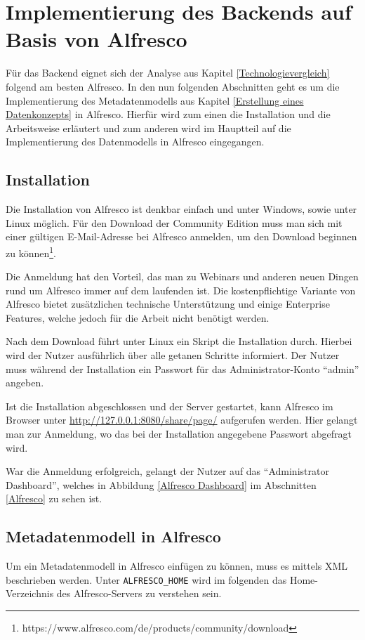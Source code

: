 \section{Implementierung des Backends auf Basis von Alfresco} \label{Implementierung Backend}
F\"ur das Backend eignet sich der Analyse aus Kapitel \ref{Technologievergleich} folgend am besten Alfresco. In den nun folgenden Abschnitten geht es um die Implementierung des Metadatenmodells aus Kapitel \ref{Erstellung eines Datenkonzepts} in Alfresco. Hierf\"ur wird zum einen die Installation und die Arbeitsweise erl\"autert und zum anderen wird im Hauptteil auf die Implementierung des Datenmodells in Alfresco eingegangen.

\subsection{Installation}
Die Installation von Alfresco ist denkbar einfach und unter Windows, sowie unter Linux m\"oglich. F\"ur den Download der Community Edition muss man sich mit einer g\"ultigen E-Mail-Adresse bei Alfresco anmelden, um den Download beginnen zu k\"onnen\footnote{https://www.alfresco.com/de/products/community/download}. 

Die Anmeldung hat den Vorteil, das man zu Webinars und anderen neuen Dingen rund um Alfresco immer auf dem laufenden ist.
Die kostenpflichtige Variante von Alfresco bietet zus\"atzlichen technische Unterst\"utzung und einige Enterprise Features, welche jedoch f\"ur die Arbeit nicht ben\"otigt werden. \cite{Wiki_Alfresco}

Nach dem Download f\"uhrt unter Linux ein Skript die Installation durch. Hierbei wird der Nutzer ausf\"uhrlich \"uber alle getanen Schritte informiert. Der Nutzer muss w\"ahrend der Installation ein Passwort f\"ur das Administrator-Konto "`admin"' angeben.\cite{Alfresco_und_Liferay}

Ist die Installation abgeschlossen und der Server gestartet, kann Alfresco im Browser unter \url{http://127.0.0.1:8080/share/page/} aufgerufen werden. Hier gelangt man zur Anmeldung, wo das bei der Installation angegebene Passwort abgefragt wird.

War die Anmeldung erfolgreich, gelangt der Nutzer auf das "`Administrator Dashboard"', welches in Abbildung \ref{Alfresco Dashboard} im Abschnitten \ref{Alfresco} zu sehen ist.

\subsection{Metadatenmodell in Alfresco} \label{Metadatenmodell von Alfresco}
Um ein Metadatenmodell in Alfresco einf\"ugen zu k\"onnen, muss es mittels XML beschrieben werden. Unter \texttt{ALFRESCO\_HOME} wird im folgenden das Home-Verzeichnis des Alfresco-Servers zu verstehen sein. 

